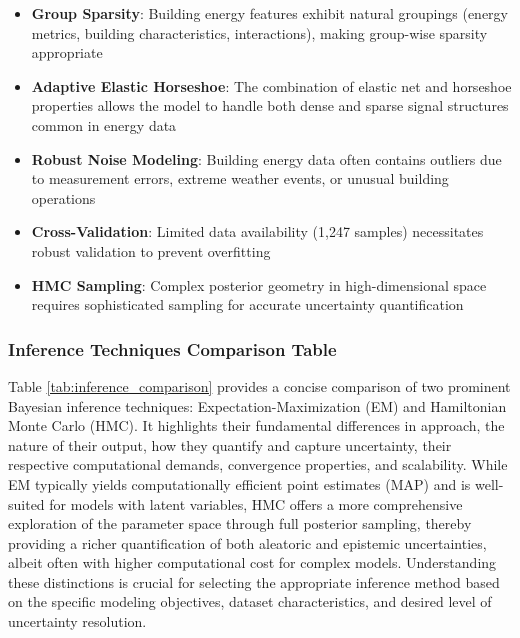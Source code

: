 \begin{itemize}
    \item \textbf{Group Sparsity}: Building energy features exhibit natural groupings (energy metrics, building characteristics, interactions), making group-wise sparsity appropriate
    \item \textbf{Adaptive Elastic Horseshoe}: The combination of elastic net and horseshoe properties allows the model to handle both dense and sparse signal structures common in energy data
    \item \textbf{Robust Noise Modeling}: Building energy data often contains outliers due to measurement errors, extreme weather events, or unusual building operations
    \item \textbf{Cross-Validation}: Limited data availability (1,247 samples) necessitates robust validation to prevent overfitting
    \item \textbf{HMC Sampling}: Complex posterior geometry in high-dimensional space requires sophisticated sampling for accurate uncertainty quantification
\end{itemize}

\subsubsection{Inference Techniques Comparison Table}

Table \ref{tab:inference_comparison} provides a concise comparison of two prominent Bayesian inference techniques: Expectation-Maximization (EM) and Hamiltonian Monte Carlo (HMC). It highlights their fundamental differences in approach, the nature of their output, how they quantify and capture uncertainty, their respective computational demands, convergence properties, and scalability. While EM typically yields computationally efficient point estimates (MAP) and is well-suited for models with latent variables, HMC offers a more comprehensive exploration of the parameter space through full posterior sampling, thereby providing a richer quantification of both aleatoric and epistemic uncertainties, albeit often with higher computational cost for complex models. Understanding these distinctions is crucial for selecting the appropriate inference method based on the specific modeling objectives, dataset characteristics, and desired level of uncertainty resolution.

